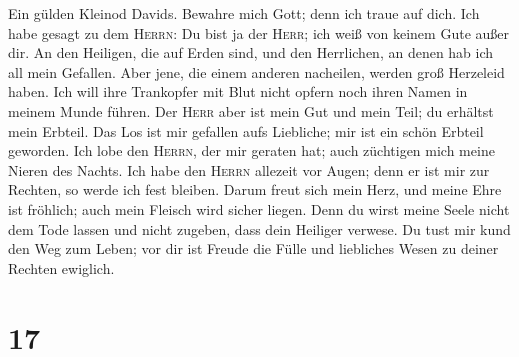  Ein gülden Kleinod Davids. Bewahre mich Gott; denn ich
traue auf dich.  Ich habe gesagt zu dem \textsc{Herrn}: Du
bist ja der \textsc{Herr}; ich weiß von keinem Gute außer dir.
 An den Heiligen, die auf Erden sind, und den Herrlichen,
an denen hab ich all mein Gefallen.  Aber jene, die einem
anderen nacheilen, werden groß Herzeleid haben. Ich will ihre Trankopfer
mit Blut nicht opfern noch ihren Namen in meinem Munde führen.
 Der \textsc{Herr} aber ist mein Gut und mein Teil; du
erhältst mein Erbteil.  Das Los ist mir gefallen aufs
Liebliche; mir ist ein schön Erbteil geworden.  Ich lobe
den \textsc{Herrn}, der mir geraten hat; auch züchtigen mich meine
Nieren des Nachts.  Ich habe den \textsc{Herrn} allezeit
vor Augen; denn er ist mir zur Rechten, so werde ich fest bleiben.
 Darum freut sich mein Herz, und meine Ehre ist fröhlich;
auch mein Fleisch wird sicher liegen.  Denn du wirst
meine Seele nicht dem Tode lassen und nicht zugeben, dass dein Heiliger
verwese.  Du tust mir kund den Weg zum Leben; vor dir ist
Freude die Fülle und liebliches Wesen zu deiner Rechten ewiglich.

\hypertarget{section-16}{%
\section{17}\label{section-16}}

